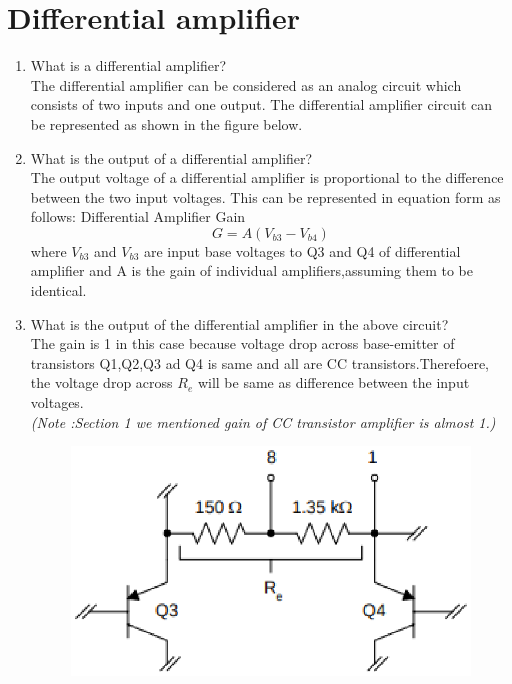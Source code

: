 \documentclass[journal,12pt,twocolumn]{IEEEtran}
\renewcommand\thesection{\arabic{section}}
\begin{document}
\section{Differential amplifier}
\begin{enumerate}[label=\thesection.\arabic*,ref=\thesection.\theenumi]
\item What is a differential amplifier?\\
\solution The differential amplifier can be considered as an analog circuit which consists of two inputs and one output. The differential amplifier circuit can be represented as shown in the figure below.\\
\item What is the output of a differential amplifier?\\
\solution The output voltage of a differential amplifier is proportional to the difference between the two input voltages. This can be represented in equation form as follows:
Differential Amplifier Gain $$G = A(V_{b3}-V_{b4})$$
where $V_{b3}$ and $V_{b3}$ are input base voltages to Q3 and Q4 of differential amplifier and A is the gain of individual amplifiers,assuming them to be identical.\\


\item What is the output of the differential amplifier in the above circuit?\\

 \solution The gain is 1 in this case because voltage drop across base-emitter of transistors Q1,Q2,Q3 ad Q4 is same and all are CC transistors.Therefoere, the voltage drop across $R_{e}$ will be same as difference between the input voltages.\\\textit{(Note :Section 1 we mentioned gain of CC transistor amplifier is almost 1.)}\\
 \begin{figure}[!ht]
\centering
\includegraphics[width=0.7\columnwidth]{./figs/LM3662.eps}
\caption{}
\label{fig:1}
\end{figure}

\end{enumerate}
\end{document}
